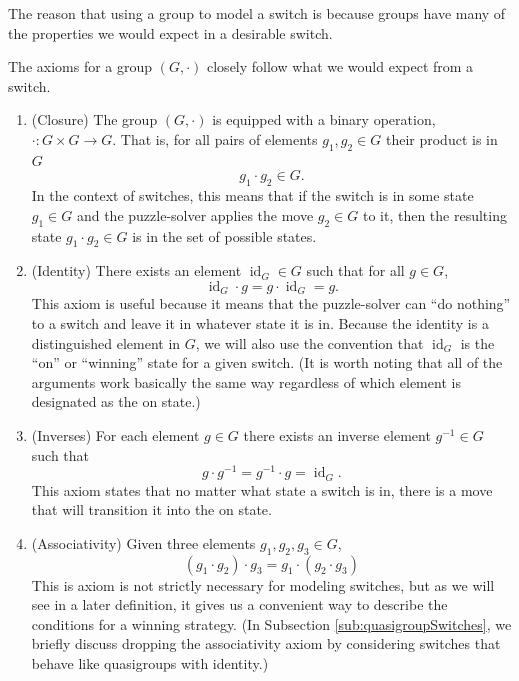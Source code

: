 The reason that using a group to model a switch is because groups have many
of the properties we would expect in a desirable switch.
\begin{note}
  The axioms for a group $(G, \cdot)$ closely follow what we would expect from
  a switch.
\end{note}
\begin{enumerate}
  \item (Closure) The group $(G, \cdot)$ is equipped with a binary operation,
  $\cdot \colon G \times G \rightarrow G$. That is, for all pairs of elements
   $g_1, g_2 \in G$ their product is in $G$ \begin{equation}
     g_1 \cdot g_2 \in G.
  \end{equation}
  In the context of switches, this
  means that if the switch is in some state $g_1 \in G$ and the puzzle-solver
  applies the move $g_2 \in G$ to it,
  then the resulting state $g_1 \cdot g_2 \in G$ is in the set of possible
  states.
  \item (Identity) There exists an element $\operatorname{id}_G \in G$ such that
  for all $g \in G$, \begin{equation}
    \operatorname{id}_G \cdot g = g \cdot \operatorname{id}_G = g.
  \end{equation}
  This axiom is useful because it means that the puzzle-solver can ``do nothing''
  to a switch and leave it in whatever state it is in.
  Because the identity is a distinguished element in $G$,
  we will also use the convention that
  $\operatorname{id}_G$ is the ``on'' or ``winning'' state for a given switch.
  (It is worth noting that all of the arguments work basically the same way
  regardless of which element is designated as the on state.)
  \item (Inverses) For each element $g \in G$ there exists an inverse element
  $g^{-1} \in G$ such that \begin{equation}
    g \cdot g^{-1} = g^{-1} \cdot g = \operatorname{id}_G.
  \end{equation}
  This axiom states that no matter what state a switch is in,
  there is a move that will transition it into the on state.
  \item (Associativity) Given three elements $g_1, g_2, g_3 \in G$,
  \begin{equation}
    (g_1 \cdot g_2) \cdot g_3 = g_1 \cdot (g_2 \cdot g_3)
  \end{equation}
  This is axiom is not strictly necessary for modeling switches,
  but as we will see in a later definition, it gives us a convenient way to
  describe the conditions for a winning strategy.
  (In Subsection \ref{sub:quasigroupSwitches}, we briefly discuss dropping
  the associativity axiom by considering switches that behave like
  quasigroups with identity.)
\end{enumerate}

